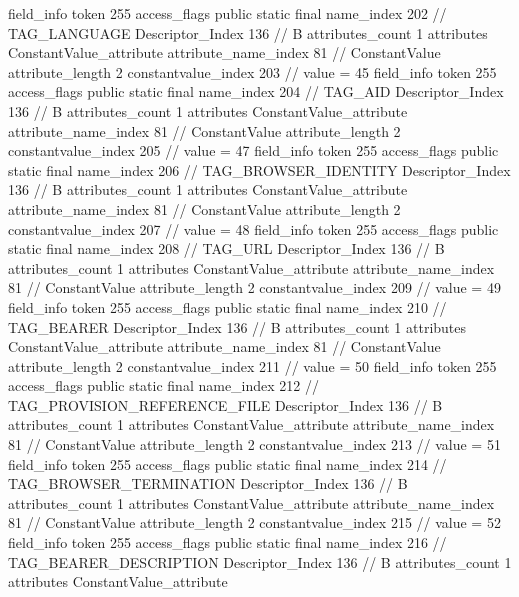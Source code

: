 {{{{{{				}
			}
			field_info {
				token	255
				access_flags	public static final
				name_index	202		// TAG_LANGUAGE
				Descriptor_Index	136		// B
				attributes_count	1
				attributes {
				ConstantValue_attribute {
					attribute_name_index	81		// ConstantValue
					attribute_length	2
					constantvalue_index	203		// value = 45
				}
				}
			}
			field_info {
				token	255
				access_flags	public static final
				name_index	204		// TAG_AID
				Descriptor_Index	136		// B
				attributes_count	1
				attributes {
				ConstantValue_attribute {
					attribute_name_index	81		// ConstantValue
					attribute_length	2
					constantvalue_index	205		// value = 47
				}
				}
			}
			field_info {
				token	255
				access_flags	public static final
				name_index	206		// TAG_BROWSER_IDENTITY
				Descriptor_Index	136		// B
				attributes_count	1
				attributes {
				ConstantValue_attribute {
					attribute_name_index	81		// ConstantValue
					attribute_length	2
					constantvalue_index	207		// value = 48
				}
				}
			}
			field_info {
				token	255
				access_flags	public static final
				name_index	208		// TAG_URL
				Descriptor_Index	136		// B
				attributes_count	1
				attributes {
				ConstantValue_attribute {
					attribute_name_index	81		// ConstantValue
					attribute_length	2
					constantvalue_index	209		// value = 49
				}
				}
			}
			field_info {
				token	255
				access_flags	public static final
				name_index	210		// TAG_BEARER
				Descriptor_Index	136		// B
				attributes_count	1
				attributes {
				ConstantValue_attribute {
					attribute_name_index	81		// ConstantValue
					attribute_length	2
					constantvalue_index	211		// value = 50
				}
				}
			}
			field_info {
				token	255
				access_flags	public static final
				name_index	212		// TAG_PROVISION_REFERENCE_FILE
				Descriptor_Index	136		// B
				attributes_count	1
				attributes {
				ConstantValue_attribute {
					attribute_name_index	81		// ConstantValue
					attribute_length	2
					constantvalue_index	213		// value = 51
				}
				}
			}
			field_info {
				token	255
				access_flags	public static final
				name_index	214		// TAG_BROWSER_TERMINATION
				Descriptor_Index	136		// B
				attributes_count	1
				attributes {
				ConstantValue_attribute {
					attribute_name_index	81		// ConstantValue
					attribute_length	2
					constantvalue_index	215		// value = 52
				}
				}
			}
			field_info {
				token	255
				access_flags	public static final
				name_index	216		// TAG_BEARER_DESCRIPTION
				Descriptor_Index	136		// B
				attributes_count	1
				attributes {
				ConstantValue_attribute {
}}}}}}}
